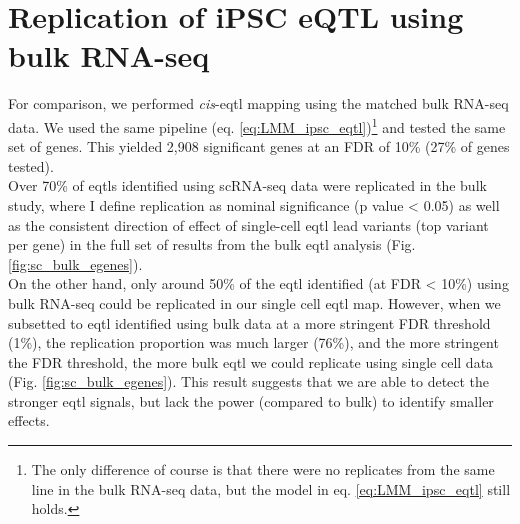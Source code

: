 






\newpage

\section{Replication of iPSC eQTL using bulk RNA-seq}

For comparison, we performed \textit{cis}-\gls{eqtl} mapping using the matched bulk RNA-seq data.
We used the same pipeline (eq. \eqref{eq:LMM_ipsc_eqtl})\footnote{The only difference of course is that there were no replicates from the same line in the bulk RNA-seq data, but the model in eq. \eqref{eq:LMM_ipsc_eqtl} still holds.} 
and tested the same set of genes. 
This yielded 2,908 significant genes at an FDR of 10\%
(27\% of genes tested). \\

Over 70\% of \glspl{eqtl} identified using scRNA-seq data were replicated in the bulk study, where I define replication as nominal significance (p value < 0.05) as well as the consistent direction of effect of single-cell \gls{eqtl} lead variants (top variant per gene) in the full set of results from the bulk \gls{eqtl} analysis (Fig. \ref{fig:sc_bulk_egenes}). \\

On the other hand, only around 50\% of the \gls{eqtl} identified (at FDR < 10\%) using bulk RNA-seq could be replicated
in our single cell \gls{eqtl} map.
However, when we subsetted to \gls{eqtl} identified using bulk data at a more stringent FDR threshold (1\%), the replication proportion was much larger (76\%), and the more stringent the FDR threshold, the more bulk \gls{eqtl} we could replicate using single cell data (Fig. \ref{fig:sc_bulk_egenes}).
This result suggests that we are able to detect the stronger \gls{eqtl} signals, but lack the power (compared to bulk) to identify smaller effects.


